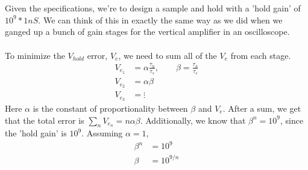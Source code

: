 \documentclass{article}
\begin{document}
\section{}
Given the specifications, we're to design a sample and hold with a 'hold gain' of $10^9*1nS$.  
We can think of this in exactly the same way as we did when we ganged up a bunch of gain stages
for the vertical amplifier in an oscilloscope.  \\
\\
To minimize the $V_{hold}$ error, $V_e$, we need to sum all of the $V_e$ from each stage.\\
\begin{align}
V_{e_1} &=\alpha \frac{\tau_h}{\tau_s}, \qquad \beta = \frac{\tau_h}{\tau_s}\\
V_{e_2} &=\alpha \beta\\
V_{e_3} &= \vdots 
\end{align} 
Here $\alpha$ is the constant of proportionality between $\beta$ and $V_e$.  After a sum, we get that the total 
error is $\sum_n{V_{e_n}}=n\alpha \beta$.  Additionally, we know that $\beta^n=10^9$, since the 'hold gain' is $10^9$.
Assuming $\alpha=1$,
\begin{align}
\beta^n &= 10^9 \\
\beta &= 10^{9/n} \\
\end{align}
\end{document}
